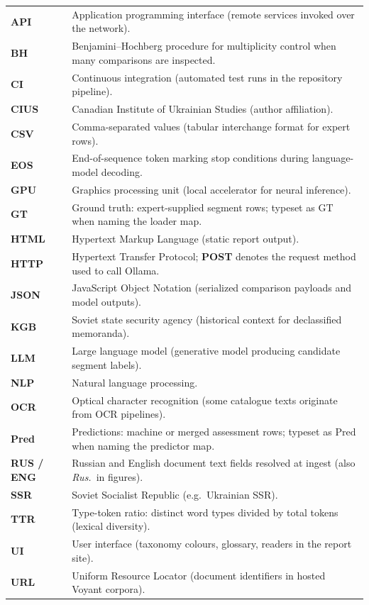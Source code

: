 \documentclass[11pt,a4paper]{article}
\theoremstyle{remark}
\newcommand{\Pred}{\mathrm{Pred}}
\newcommand{\GT}{\mathrm{GT}}
\begin{document}
\begin{tabular}{@{}p{2.6cm}p{11.2cm}@{}}
\textbf{API} & Application programming interface (remote services invoked over the network). \\
\textbf{BH} & Benjamini--Hochberg procedure for multiplicity control when many comparisons are inspected. \\
\textbf{CI} & Continuous integration (automated test runs in the repository pipeline). \\
\textbf{CIUS} & Canadian Institute of Ukrainian Studies (author affiliation). \\
\textbf{CSV} & Comma-separated values (tabular interchange format for expert rows). \\
\textbf{EOS} & End-of-sequence token marking stop conditions during language-model decoding. \\
\textbf{GPU} & Graphics processing unit (local accelerator for neural inference). \\
\textbf{GT} & Ground truth: expert-supplied segment rows; typeset as $\GT$ when naming the loader map. \\
\textbf{HTML} & Hypertext Markup Language (static report output). \\
\textbf{HTTP} & Hypertext Transfer Protocol; \textbf{POST} denotes the request method used to call Ollama. \\
\textbf{JSON} & JavaScript Object Notation (serialized comparison payloads and model outputs). \\
\textbf{KGB} & Soviet state security agency (historical context for declassified memoranda). \\
\textbf{LLM} & Large language model (generative model producing candidate segment labels). \\
\textbf{NLP} & Natural language processing. \\
\textbf{OCR} & Optical character recognition (some catalogue texts originate from OCR pipelines). \\
\textbf{Pred} & Predictions: machine or merged assessment rows; typeset as $\Pred$ when naming the predictor map. \\
\textbf{RUS / ENG} & Russian and English document text fields resolved at ingest (also \textit{Rus.}\ in figures). \\
\textbf{SSR} & Soviet Socialist Republic (e.g.\ Ukrainian SSR). \\
\textbf{TTR} & Type-token ratio: distinct word types divided by total tokens (lexical diversity). \\
\textbf{UI} & User interface (taxonomy colours, glossary, readers in the report site). \\
\textbf{URL} & Uniform Resource Locator (document identifiers in hosted Voyant corpora). \\
\end{tabular}
\end{document}
